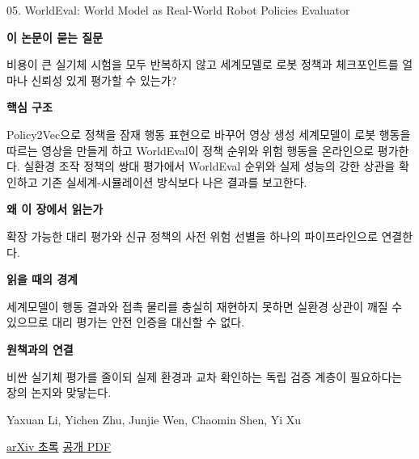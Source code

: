 \documentclass[11pt,openany]{book}
\begin{document}
\begin{termcard}{05. WorldEval: World Model as Real-World Robot Policies Evaluator}

\par

\medskip

{\sffamily\bfseries\color{deepblue} 이 논문이 묻는 질문}\par

비용이 큰 실기체 시험을 모두 반복하지 않고 세계모델로 로봇 정책과 체크포인트를 얼마나 신뢰성 있게 평가할 수 있는가?

\smallskip

{\sffamily\bfseries\color{deepblue} 핵심 구조}\par

Policy2Vec으로 정책을 잠재 행동 표현으로 바꾸어 영상 생성 세계모델이 로봇 행동을 따르는 영상을 만들게 하고 WorldEval이 정책 순위와 위험 행동을 온라인으로 평가한다. 실환경 조작 정책의 쌍대 평가에서 WorldEval 순위와 실제 성능의 강한 상관을 확인하고 기존 실세계-시뮬레이션 방식보다 나은 결과를 보고한다.

\smallskip

{\sffamily\bfseries\color{deepblue} 왜 이 장에서 읽는가}\par

확장 가능한 대리 평가와 신규 정책의 사전 위험 선별을 하나의 파이프라인으로 연결한다.

\smallskip

{\sffamily\bfseries\color{coral} 읽을 때의 경계}\par

세계모델이 행동 결과와 접촉 물리를 충실히 재현하지 못하면 실환경 상관이 깨질 수 있으므로 대리 평가는 안전 인증을 대신할 수 없다.

\smallskip

{\sffamily\bfseries\color{teal} 원책과의 연결}\par

비싼 실기체 평가를 줄이되 실제 환경과 교차 확인하는 독립 검증 계층이 필요하다는 장의 논지와 맞닿는다.

\medskip

{\footnotesize\color{muted} Yaxuan Li, Yichen Zhu, Junjie Wen, Chaomin Shen, Yi Xu\par

\href{https://arxiv.org/abs/2505.19017}{arXiv 초록} \quad \href{https://arxiv.org/pdf/2505.19017}{공개 PDF}\par}

\end{termcard}
\end{document}
